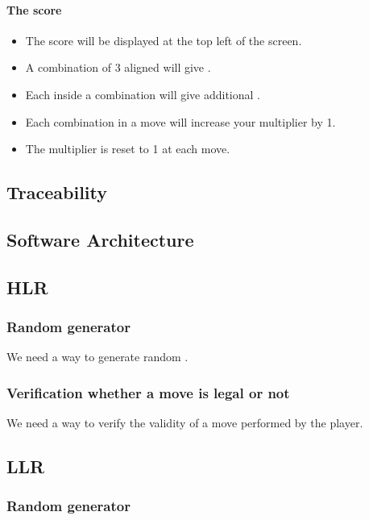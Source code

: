 \paragraph{The score}

\begin{itemize}
\item The score will be displayed at the top left of the screen.
\item A combination of 3 aligned \sqs will give \threepts \pts.
\item Each \sq inside a combination will give \sqpts additional \pts.
\item Each combination in a move will increase your multiplier by 1.
\item The multiplier is reset to 1 at each move.
\end{itemize}

\subsection{Traceability}

\subsection{Software Architecture}

\subsection{HLR}

\subsubsection{Random \sq generator}

We need a way to generate random \sqs.

\subsubsection{Verification whether a move is legal or not}

We need a way to verify the validity of a move performed by the player.

\subsection{LLR}

\subsubsection{Random \sq generator}

